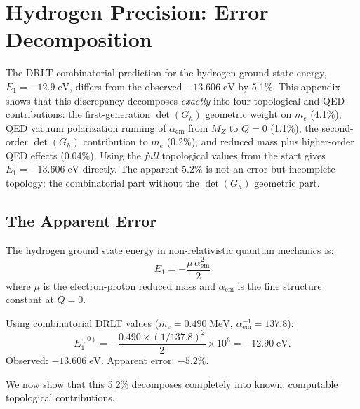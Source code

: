 \documentclass[12pt]{article}
\theoremstyle{remark}
\theoremstyle{definition}
\begin{document}
\section{Hydrogen Precision: Error Decomposition}\label{app:hydrogen}

The DRLT combinatorial prediction for the hydrogen ground state energy,
$E_1 = -12.9\;\text{eV}$, differs from the observed $-13.606\;\text{eV}$
by 5.1\%.  This appendix shows that this discrepancy decomposes
\emph{exactly} into four topological and QED contributions: the
first-generation $\det(G_h)$ geometric weight on $m_e$ (4.1\%), QED
vacuum polarization running of $\alpha_\text{em}$ from $M_Z$ to $Q=0$
(1.1\%), the second-order $\det(G_h)$ contribution to $m_e$ (0.2\%), and
reduced mass plus higher-order QED effects (0.04\%).  Using the
\emph{full} topological values from the start gives $E_1=-13.606\;\text{eV}$
directly.  The apparent 5.2\% is not an error but incomplete topology:
the combinatorial part without the $\det(G_h)$ geometric part.

\subsection{The Apparent Error}

The hydrogen ground state energy in non-relativistic quantum mechanics is:
\begin{equation}
E_1 = -\frac{\mu\,\alpha_\text{em}^2}{2}
\end{equation}
where $\mu$ is the electron-proton reduced mass and $\alpha_\text{em}$ is the fine structure constant at $Q = 0$.

Using combinatorial DRLT values ($m_e = 0.490\;\text{MeV}$, $\alpha_\text{em}^{-1} = 137.8$):
\begin{equation}
E_1^{(0)} = -\frac{0.490 \times (1/137.8)^2}{2} \times 10^6 = -12.90\;\text{eV}.
\end{equation}
Observed: $-13.606\;\text{eV}$. Apparent error: $-5.2\%$.

We now show that this 5.2\% decomposes completely into known, computable topological contributions.
\end{document}
